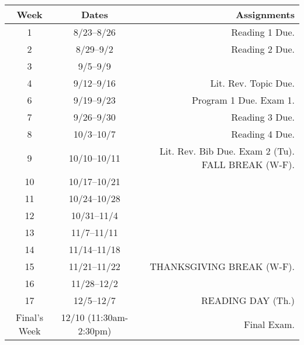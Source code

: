 \documentclass[10pt]{article}
\begin{document}
\begin{center}
\begin{tabular}{ccr}
\toprule
Week & Dates & Assignments \\
\toprule
1 & 8/23--8/26 & Reading 1 Due. \\
2 & 8/29--9/2 &  Reading 2 Due. \\
3 & 9/5--9/9 &   \\
4 & 9/12--9/16 &  Lit. Rev. Topic Due. \\
6 & 9/19--9/23 & Program 1 Due. Exam 1.\\
7 & 9/26--9/30  &  Reading 3 Due.\\
8 & 10/3--10/7 &  Reading 4 Due. \\
9 & 10/10--10/11 &  Lit. Rev. Bib Due. Exam 2 (Tu). FALL BREAK (W-F). \\
10 & 10/17--10/21 &  \\
11 & 10/24--10/28 & \\
12 & 10/31--11/4 &  \\
13 & 11/7--11/11 & \\
14 & 11/14--11/18 &  \\
15 & 11/21--11/22 &  THANKSGIVING BREAK (W-F).  \\
16 & 11/28--12/2 &    \\
17 & 12/5--12/7 &   READING DAY (Th.) \\
\midrule
Final's Week & 12/10 (11:30am-2:30pm) & Final Exam. \\
\bottomrule
\end{tabular}
\end{center}
\end{document}
